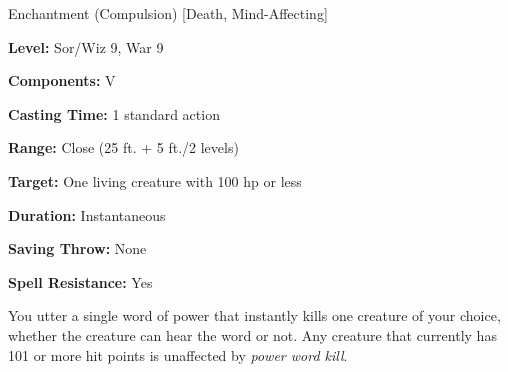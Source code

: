 
Enchantment (Compulsion) [Death, Mind-Affecting]

\textbf{Level:} Sor/Wiz 9, War 9

\textbf{Components:} V

\textbf{Casting Time:} 1 standard action

\textbf{Range:} Close (25 ft. + 5 ft./2 levels)

\textbf{Target:} One living creature with 100 hp or less

\textbf{Duration:} Instantaneous

\textbf{Saving Throw:} None

\textbf{Spell Resistance:} Yes

You utter a single word of power that instantly kills one creature of your choice, 
whether the creature can hear the word or not. Any creature that currently has 
101 or more hit points is unaffected by \textit{power word kill}.

